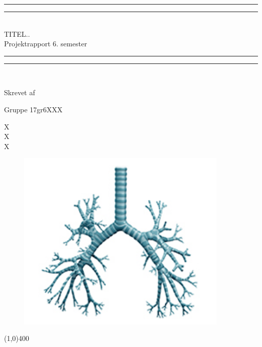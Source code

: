 \begin{center}
\vspace*{\baselineskip}
\rule{\textwidth}{1.6pt}\vspace*{-\baselineskip}\vspace*{2pt} %
\rule{\textwidth}{0.4pt}\\[\baselineskip] %

{\huge TITEL..\\[0.4\baselineskip] \LARGE Projektrapport 6. semester}\\[0.2\baselineskip] %

\rule{\textwidth}{0.4pt}\vspace*{-\baselineskip}\vspace{3.2pt} %
\rule{\textwidth}{1.6pt}\\[\baselineskip] %
\vspace*{3\baselineskip}



Skrevet af \\
{\Large Gruppe 17gr6XXX\par}
\end{center} %
{\color{white}X \\ X \\ X \\}
\begin{figure}[H]
	\centering
	\begin{minipage}[b]{1\textwidth}	\includegraphics[width=0.9\textwidth]{figures/Lunger}
	\end{minipage}
	\hfill
\end{figure}

%	
\begin{center}
\line(1,0){400}
\end{center}

